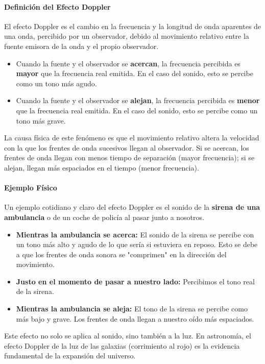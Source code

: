 \paragraph{Definición del Efecto Doppler}
El efecto Doppler es el cambio en la frecuencia y la longitud de onda aparentes de una onda, percibido por un observador, debido al movimiento relativo entre la fuente emisora de la onda y el propio observador.
\begin{itemize}
    \item Cuando la fuente y el observador se \textbf{acercan}, la frecuencia percibida es \textbf{mayor} que la frecuencia real emitida. En el caso del sonido, esto se percibe como un tono más agudo.
    \item Cuando la fuente y el observador se \textbf{alejan}, la frecuencia percibida es \textbf{menor} que la frecuencia real emitida. En el caso del sonido, esto se percibe como un tono más grave.
\end{itemize}
La causa física de este fenómeno es que el movimiento relativo altera la velocidad con la que los frentes de onda sucesivos llegan al observador. Si se acercan, los frentes de onda llegan con menos tiempo de separación (mayor frecuencia); si se alejan, llegan más espaciados en el tiempo (menor frecuencia).

\paragraph{Ejemplo Físico}
Un ejemplo cotidiano y claro del efecto Doppler es el sonido de la \textbf{sirena de una ambulancia} o de un coche de policía al pasar junto a nosotros.
\begin{itemize}
    \item \textbf{Mientras la ambulancia se acerca:} El sonido de la sirena se percibe con un tono más alto y agudo de lo que sería si estuviera en reposo. Esto se debe a que los frentes de onda sonora se "comprimen" en la dirección del movimiento.
    \item \textbf{Justo en el momento de pasar a nuestro lado:} Percibimos el tono real de la sirena.
    \item \textbf{Mientras la ambulancia se aleja:} El tono de la sirena se percibe como más bajo y grave. Los frentes de onda llegan a nuestro oído más espaciados.
\end{itemize}
Este efecto no solo se aplica al sonido, sino también a la luz. En astronomía, el efecto Doppler de la luz de las galaxias (corrimiento al rojo) es la evidencia fundamental de la expansión del universo.

